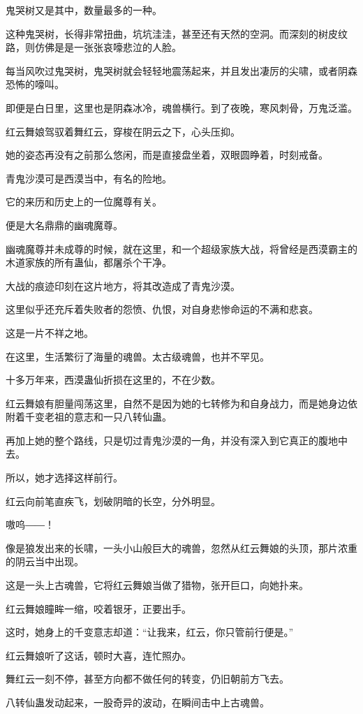 \begin{this_body}
鬼哭树又是其中，数量最多的一种。

这种鬼哭树，长得非常扭曲，坑坑洼洼，甚至还有天然的空洞。而深刻的树皮纹路，则仿佛是是一张张哀嚎悲泣的人脸。

每当风吹过鬼哭树，鬼哭树就会轻轻地震荡起来，并且发出凄厉的尖啸，或者阴森恐怖的嚎叫。

即便是白日里，这里也是阴森冰冷，魂兽横行。到了夜晚，寒风刺骨，万鬼泛滥。

红云舞娘驾驭着舞红云，穿梭在阴云之下，心头压抑。

她的姿态再没有之前那么悠闲，而是直接盘坐着，双眼圆睁着，时刻戒备。

青鬼沙漠可是西漠当中，有名的险地。

它的来历和历史上的一位魔尊有关。

便是大名鼎鼎的幽魂魔尊。

幽魂魔尊并未成尊的时候，就在这里，和一个超级家族大战，将曾经是西漠霸主的木道家族的所有蛊仙，都屠杀个干净。

大战的痕迹印刻在这片地方，将其改造成了青鬼沙漠。

这里似乎还充斥着失败者的怨愤、仇恨，对自身悲惨命运的不满和悲哀。

这是一片不祥之地。

在这里，生活繁衍了海量的魂兽。太古级魂兽，也并不罕见。

十多万年来，西漠蛊仙折损在这里的，不在少数。

红云舞娘有胆量闯荡这里，自然不是因为她的七转修为和自身战力，而是她身边依附着千变老祖的意志和一只八转仙蛊。

再加上她的整个路线，只是切过青鬼沙漠的一角，并没有深入到它真正的腹地中去。

所以，她才选择这样前行。

红云向前笔直疾飞，划破阴暗的长空，分外明显。

嗷呜――！

像是狼发出来的长啸，一头小山般巨大的魂兽，忽然从红云舞娘的头顶，那片浓重的阴云当中出现。

这是一头上古魂兽，它将红云舞娘当做了猎物，张开巨口，向她扑来。

红云舞娘瞳眸一缩，咬着银牙，正要出手。

这时，她身上的千变意志却道：“让我来，红云，你只管前行便是。”

红云舞娘听了这话，顿时大喜，连忙照办。

舞红云一刻不停，甚至方向都不做任何的转变，仍旧朝前方飞去。

八转仙蛊发动起来，一股奇异的波动，在瞬间击中上古魂兽。


\end{this_body}
